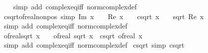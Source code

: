 \begin{isabellebody}
%
\isadelimproof
\ \ %
\endisadelimproof
%
\isatagproof
{}\isamarkupfalse%
\ {\isacharparenleft}{\kern0pt}simp\ add{\isacharcolon}{\kern0pt}\ complex{\isacharunderscore}{\kern0pt}eq{\isacharunderscore}{\kern0pt}iff\ norm{\isacharunderscore}{\kern0pt}complex{\isacharunderscore}{\kern0pt}def{\isacharparenright}{\kern0pt}%
\endisatagproof
{\isafoldproof}%
%
\isadelimproof
\isanewline
%
\endisadelimproof
\isanewline
{}\isamarkupfalse%
\ csqrt{\isacharunderscore}{\kern0pt}of{\isacharunderscore}{\kern0pt}real{\isacharunderscore}{\kern0pt}nonpos\ {\isacharbrackleft}{\kern0pt}simp{\isacharbrackright}{\kern0pt}{\isacharcolon}{\kern0pt}\ {\isachardoublequoteopen}Im\ x\ {\isacharequal}{\kern0pt}\ {}\ {\isasymLongrightarrow}\ Re\ x\ {\isasymle}\ {}\ {\isasymLongrightarrow}\ csqrt\ x\ {\isacharequal}{\kern0pt}\ {\isasymi}\ {\isacharasterisk}{\kern0pt}\ sqrt\ {\isasymbar}Re\ x{\isasymbar}{\isachardoublequoteclose}\isanewline
%
\isadelimproof
\ \ %
\endisadelimproof
%
\isatagproof
{}\isamarkupfalse%
\ {\isacharparenleft}{\kern0pt}simp\ add{\isacharcolon}{\kern0pt}\ complex{\isacharunderscore}{\kern0pt}eq{\isacharunderscore}{\kern0pt}iff\ norm{\isacharunderscore}{\kern0pt}complex{\isacharunderscore}{\kern0pt}def{\isacharparenright}{\kern0pt}%
\endisatagproof
{\isafoldproof}%
%
\isadelimproof
\isanewline
%
\endisadelimproof
\isanewline
{}\isamarkupfalse%
\ of{\isacharunderscore}{\kern0pt}real{\isacharunderscore}{\kern0pt}sqrt{\isacharcolon}{\kern0pt}\ {\isachardoublequoteopen}x\ {\isasymge}\ {}\ {\isasymLongrightarrow}\ of{\isacharunderscore}{\kern0pt}real\ {\isacharparenleft}{\kern0pt}sqrt\ x{\isacharparenright}{\kern0pt}\ {\isacharequal}{\kern0pt}\ csqrt\ {\isacharparenleft}{\kern0pt}of{\isacharunderscore}{\kern0pt}real\ x{\isacharparenright}{\kern0pt}{\isachardoublequoteclose}\isanewline
%
\isadelimproof
\ \ %
\endisadelimproof
%
\isatagproof
{}\isamarkupfalse%
\ {\isacharparenleft}{\kern0pt}simp\ add{\isacharcolon}{\kern0pt}\ complex{\isacharunderscore}{\kern0pt}eq{\isacharunderscore}{\kern0pt}iff\ norm{\isacharunderscore}{\kern0pt}complex{\isacharunderscore}{\kern0pt}def{\isacharparenright}{\kern0pt}%
\endisatagproof
{\isafoldproof}%
%
\isadelimproof
\isanewline
%
\endisadelimproof
\isanewline
{}\isamarkupfalse%
\ csqrt{\isacharunderscore}{\kern0pt}{}\ {\isacharbrackleft}{\kern0pt}simp{\isacharbrackright}{\kern0pt}{\isacharcolon}{\kern0pt}\ {\isachardoublequoteopen}csqrt\ {}\ {\isacharequal}{\kern0pt}\ {}{\isachardoublequoteclose}\isanewline

\end{isabellebody}
